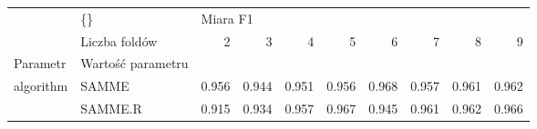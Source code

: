 \begin{tabular}{llrrrrrrrr}
\hline
          & \{\} & \multicolumn{8}{l}{Miara F1} \\
          & Liczba foldów &        2 &      3 &      4 &      5 &      6 &      7 &      8 &      9 \\
Parametr & Wartość parametru &          &        &        &        &        &        &        &        \\
\hline
algorithm & SAMME &    0.956 &  0.944 &  0.951 &  0.956 &  0.968 &  0.957 &  0.961 &  0.962 \\
          & SAMME.R &    0.915 &  0.934 &  0.957 &  0.967 &  0.945 &  0.961 &  0.962 &  0.966 \\
\hline
\end{tabular}
